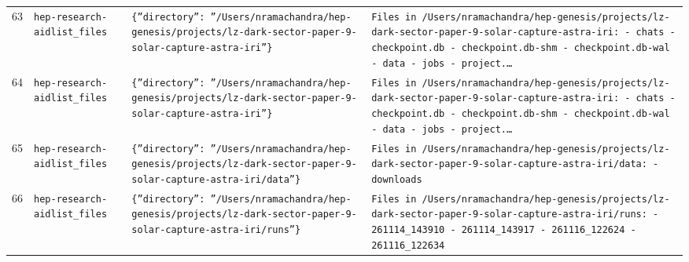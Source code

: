 \documentclass[11pt,a4paper]{article}
\begin{document}
\begin{longtable}{@{}p{}p{}p{}p{}@{}}
63 & \texttt{hep-research-aid}\newline\texttt{list\_\allowbreak{}files} & \texttt{\{''directory'':\allowbreak{} ''/\allowbreak{}Users/\allowbreak{}nramachandra/\allowbreak{}hep-genesis/\allowbreak{}projects/\allowbreak{}lz-dark-sector-paper-9-solar-capture-astra-iri''\}\allowbreak{}} & \texttt{Files in /\allowbreak{}Users/\allowbreak{}nramachandra/\allowbreak{}hep-genesis/\allowbreak{}projects/\allowbreak{}lz-dark-sector-paper-9-solar-capture-astra-iri:\allowbreak{}   - chats   - checkpoint.db   - checkpoint.db-shm   - checkpoint.db-wal   - data   - jobs   - project.\ldots{}\allowbreak{}} \\
64 & \texttt{hep-research-aid}\newline\texttt{list\_\allowbreak{}files} & \texttt{\{''directory'':\allowbreak{} ''/\allowbreak{}Users/\allowbreak{}nramachandra/\allowbreak{}hep-genesis/\allowbreak{}projects/\allowbreak{}lz-dark-sector-paper-9-solar-capture-astra-iri''\}\allowbreak{}} & \texttt{Files in /\allowbreak{}Users/\allowbreak{}nramachandra/\allowbreak{}hep-genesis/\allowbreak{}projects/\allowbreak{}lz-dark-sector-paper-9-solar-capture-astra-iri:\allowbreak{}   - chats   - checkpoint.db   - checkpoint.db-shm   - checkpoint.db-wal   - data   - jobs   - project.\ldots{}\allowbreak{}} \\
65 & \texttt{hep-research-aid}\newline\texttt{list\_\allowbreak{}files} & \texttt{\{''directory'':\allowbreak{} ''/\allowbreak{}Users/\allowbreak{}nramachandra/\allowbreak{}hep-genesis/\allowbreak{}projects/\allowbreak{}lz-dark-sector-paper-9-solar-capture-astra-iri/\allowbreak{}data''\}\allowbreak{}} & \texttt{Files in /\allowbreak{}Users/\allowbreak{}nramachandra/\allowbreak{}hep-genesis/\allowbreak{}projects/\allowbreak{}lz-dark-sector-paper-9-solar-capture-astra-iri/\allowbreak{}data:\allowbreak{}   - downloads} \\
66 & \texttt{hep-research-aid}\newline\texttt{list\_\allowbreak{}files} & \texttt{\{''directory'':\allowbreak{} ''/\allowbreak{}Users/\allowbreak{}nramachandra/\allowbreak{}hep-genesis/\allowbreak{}projects/\allowbreak{}lz-dark-sector-paper-9-solar-capture-astra-iri/\allowbreak{}runs''\}\allowbreak{}} & \texttt{Files in /\allowbreak{}Users/\allowbreak{}nramachandra/\allowbreak{}hep-genesis/\allowbreak{}projects/\allowbreak{}lz-dark-sector-paper-9-solar-capture-astra-iri/\allowbreak{}runs:\allowbreak{}   - 261114\_\allowbreak{}143910   - 261114\_\allowbreak{}143917   - 261116\_\allowbreak{}122624   - 261116\_\allowbreak{}122634} \\

\end{longtable}
\end{document}
